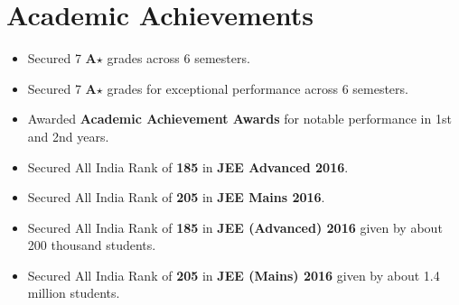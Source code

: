 \section*{Academic Achievements}
\begin{itemize}

\setlength\itemsep{0pt}
\item Secured 7 \textbf{A$\star$} grades across 6 semesters.
\item Secured 7 \textbf{A$\star$} grades for exceptional performance across 6 semesters.
\item Awarded \textbf{Academic Achievement Awards} for notable performance in 1st and 2nd years.
\item Secured All India Rank of {\bf 185} in {\bf JEE Advanced 2016}.
\item Secured All India Rank of {\bf 205} in {\bf JEE Mains 2016}.
\item Secured All India Rank of {\bf 185} in {\bf JEE (Advanced) 2016} given by about 200 thousand students.
\item Secured All India Rank of {\bf 205} in {\bf JEE (Mains) 2016} given by about 1.4 million students.

\end{itemize}
